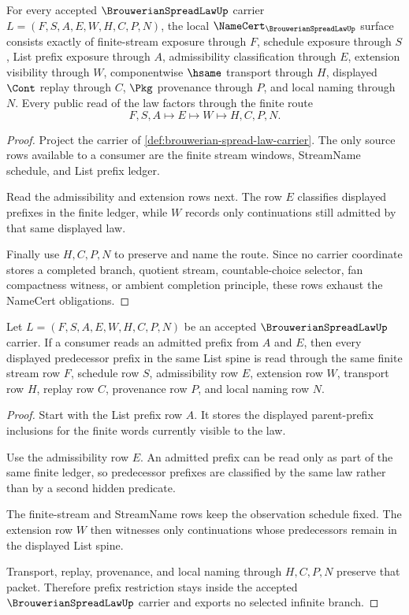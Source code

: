 \begin{theorem}
\label{thm:brouwerian-spread-law-namecert-obligations}
For every accepted $\BrouwerianSpreadLawUp$ carrier $L=(F,S,A,E,W,H,C,P,N)$, the local $\NameCert_{\BrouwerianSpreadLawUp}$ surface consists exactly of finite-stream exposure through $F$, schedule exposure through $S$, List prefix exposure through $A$, admissibility classification through $E$, extension visibility through $W$, componentwise $\hsame$ transport through $H$, displayed $\Cont$ replay through $C$, $\Pkg$ provenance through $P$, and local naming through $N$. Every public read of the law factors through the finite route
$$
F,S,A \longmapsto E \longmapsto W \longmapsto H,C,P,N .
$$
\end{theorem}
\begin{proof}
Project the carrier of \autoref{def:brouwerian-spread-law-carrier}. The only source rows available to a consumer are the finite stream windows, StreamName schedule, and List prefix ledger.

Read the admissibility and extension rows next. The row $E$ classifies displayed prefixes in the finite ledger, while $W$ records only continuations still admitted by that same displayed law.

Finally use $H,C,P,N$ to preserve and name the route. Since no carrier coordinate stores a completed branch, quotient stream, countable-choice selector, fan compactness witness, or ambient completion principle, these rows exhaust the NameCert obligations.
\end{proof}

\begin{theorem}
\label{thm:brouwerian-spread-law-prefix-closure}
Let $L=(F,S,A,E,W,H,C,P,N)$ be an accepted $\BrouwerianSpreadLawUp$ carrier. If a consumer reads an admitted prefix from $A$ and $E$, then every displayed predecessor prefix in the same List spine is read through the same finite stream row $F$, schedule row $S$, admissibility row $E$, extension row $W$, transport row $H$, replay row $C$, provenance row $P$, and local naming row $N$.
\end{theorem}
\begin{proof}
Start with the List prefix row $A$. It stores the displayed parent-prefix inclusions for the finite words currently visible to the law.

Use the admissibility row $E$. An admitted prefix can be read only as part of the same finite ledger, so predecessor prefixes are classified by the same law rather than by a second hidden predicate.

The finite-stream and StreamName rows keep the observation schedule fixed. The extension row $W$ then witnesses only continuations whose predecessors remain in the displayed List spine.

Transport, replay, provenance, and local naming through $H,C,P,N$ preserve that packet. Therefore prefix restriction stays inside the accepted $\BrouwerianSpreadLawUp$ carrier and exports no selected infinite branch.
\end{proof}

